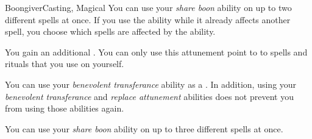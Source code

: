 \begin{feat}{Boongiver}{Casting, Magical}
         You can use your \textit{share boon} ability on up to two different spells at once.
        If you use the ability while it already affects another spell, you choose which spells are affected by the ability.

         You gain an additional .
        You can only use this attunement point to  to spells and rituals that you use on yourself.

         You can use your \textit{benevolent transferance} ability as a .
        In addition, using your \textit{benevolent transferance} and \textit{replace attunement} abilities does not prevent you from using those abilities again.

         You can use your \textit{share boon} ability on up to three different spells at once.
    \end{feat}

